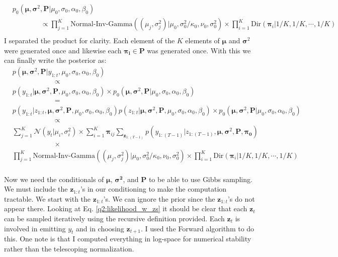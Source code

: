\begin{align}
    &p_0( \boldsymbol{\mu}, \boldsymbol{\sigma}^2, \mathbf{P}| \mu_0, \sigma_0, \alpha_0, \beta_0) \\
    &{\qquad\qquad}\propto \prod_{j=1}^K \text{Normal-Inv-Gamma}((\mu_j, \sigma^2_j)|\mu_0, \sigma^2_0/\kappa_0, \nu_0, \sigma^2_0)\times\prod_{i=1}^K\text{Dir}(\boldsymbol{\pi}_i|1/K, 1/K, \cdots, 1/K)\\
\end{align}
I separated the product for clarity.
Each element of the $K$ elements of  $\boldsymbol{\mu}$ and $\boldsymbol{\sigma}^2$ were generated once and likewise each $\boldsymbol{\pi_i}\in \mathbf{P}$ was generated once.
With this we can finally write the posterior as:
\begin{align}
    &p(\boldsymbol{\mu}, \boldsymbol{\sigma}^2, \mathbf{P}|y_{1:t}, \mu_0, \sigma_0, \alpha_0, \beta_0) \\
    &{\qquad\qquad\qquad\propto}\\
                      &p(y_{1:t} |\boldsymbol{\mu}, \boldsymbol{\sigma}^2, \mathbf{P}, \mu_0, \sigma_0, \alpha_0, \beta_0)
    \times p_0( \boldsymbol{\mu}, \boldsymbol{\sigma}^2, \mathbf{P}| \mu_0, \sigma_0, \alpha_0, \beta_0)\\
    &{\qquad\qquad\qquad=}\\
    &p(y_{1:t} |z_{1:t}, \boldsymbol{\mu}, \boldsymbol{\sigma}^2, \mathbf{P}, \mu_0, \sigma_0, \alpha_0, \beta_0)
        p( z_{1:t}| \boldsymbol{\mu}, \boldsymbol{\sigma}^2, \mathbf{P}, \mu_0, \sigma_0, \alpha_0, \beta_0)
    \times p_0( \boldsymbol{\mu}, \boldsymbol{\sigma}^2, \mathbf{P}| \mu_0, \sigma_0, \alpha_0, \beta_0)\\
    &{\qquad\qquad\qquad}\propto\\
    \label{q2:prop_posterior}
    &\sum_{j=1}^K \mathcal{N}(y_t|\mu_i, \sigma_i^2)\times\sum_{i=1}^K \boldsymbol{\pi}_{ij} 
         \sum_{\mathbf{z}_{1:(T-1)}}p(y_{1:(T-1)} | z_{1:(T-1)}, \boldsymbol{\mu}, \boldsymbol{\sigma}^2, \mathbf{P}, \boldsymbol{\pi_0})\\
    &{\qquad\qquad\qquad}\times\\
      &\prod_{j=1}^K \text{Normal-Inv-Gamma}((\mu_j, \sigma^2_j)|\mu_0, \sigma^2_0/\kappa_0, \nu_0, \sigma^2_0)\times\prod_{i=1}^K\text{Dir}(\boldsymbol{\pi}_i|1/K, 1/K, \cdots, 1/K)\\
\end{align}

Now we need the conditionals of $\boldsymbol{\mu}$, $\boldsymbol{\sigma^2}$, and $\boldsymbol{P}$ to be able to use Gibbs sampling.
We must include the $\mathbf{z}_{1:t}$'s in our conditioning to make the computation tractable.
We start with the $\mathbf{z}_{1:t}$'s.
We can ignore the prior since the $\mathbf{z}_{1:t}$'s do not appear there.
Looking at Eq. \ref{q2:likelihood_w_zs} it should be clear that each $\mathbf{z}_t$ can be sampled iteratively using the recursive definition provided.
Each $\mathbf{z}_t$ is involved in emitting $y_t$ and in choosing $\mathbf{z}_{t+1}$. 
I used the Forward algorithm to do this.
One note is that I computed everything in log-space for numerical stability rather than the telescoping normalization.


